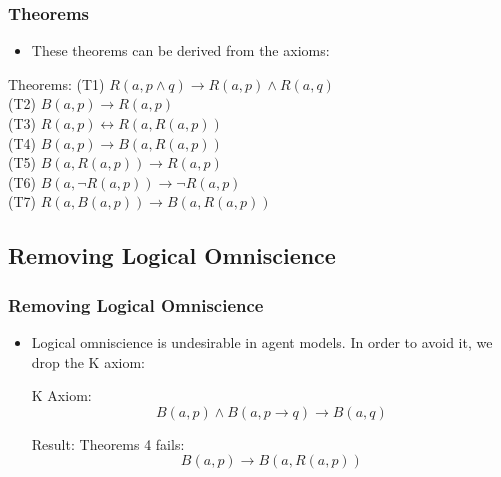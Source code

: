 \documentclass[aspectratio=169]{beamer}
\begin{document}
\begin{frame}
\frametitle{Theorems}
\begin{itemize}
    \item These theorems can be derived from the axioms:
\end{itemize}
\begin{block}{Theorems:}
    \Large
    \normalfont
    (T1) $R(a, p \wedge q) \rightarrow R(a, p) \wedge R(a, q)$ \\
    (T2) $B(a, p) \rightarrow R(a, p)$ \\
    (T3) $R(a, p) \leftrightarrow R(a, R(a, p))$ \\
    (T4) $B(a, p) \rightarrow B(a, R(a, p))$ \\
    (T5) $B(a, R(a, p)) \rightarrow R(a, p)$ \\
    (T6) $B(a, \neg R(a, p)) \rightarrow \neg R(a, p)$ \\
    (T7) $R(a, B(a, p)) \rightarrow B(a, R(a, p))$
\end{block}
\end{frame}

\subsection{Removing Logical Omniscience}
\begin{frame}
\frametitle{Removing Logical Omniscience}
\Large 
\begin{itemize}
    \item Logical omniscience is undesirable in agent models. In order to avoid it, we drop the K axiom:
    \begin{block}{K Axiom:}
    \[
    B(a, p) \wedge B(a, p \rightarrow q) \rightarrow B(a, q)
    \]
    \end{block}
    \begin{block}{Result:}
        Theorems 4 fails: 
        \[
        B(a, p) \rightarrow B(a, R(a, p))
        \]
    \end{block}
\end{itemize}
\end{frame}

\end{document}
